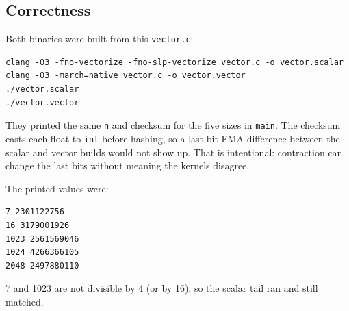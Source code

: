 \documentclass[11pt,a4paper]{article}
\begin{document}
\subsection*{Correctness}

Both binaries were built from this \texttt{vector.c}:

\begin{lstlisting}[language={}]
clang -O3 -fno-vectorize -fno-slp-vectorize vector.c -o vector.scalar
clang -O3 -march=native vector.c -o vector.vector
./vector.scalar
./vector.vector
\end{lstlisting}

They printed the same \texttt{n} and checksum for the five sizes in
\texttt{main}. The checksum casts each float to \texttt{int} before
hashing, so a last-bit FMA difference between the scalar and vector
builds would not show up. That is intentional: contraction can change
the last bits without meaning the kernels disagree.

The printed values were:

\begin{lstlisting}[language={}]
7 2301122756
16 3179001926
1023 2561569046
1024 4266366105
2048 2497880110
\end{lstlisting}

7 and 1023 are not divisible by 4 (or by 16), so the scalar tail ran
and still matched.
\end{document}
